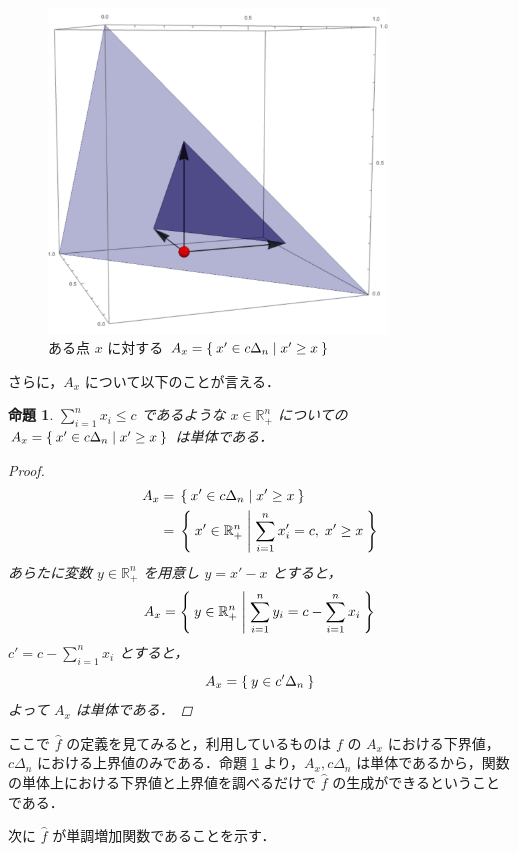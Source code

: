 \documentclass[a4paper,11pt]{jreport}
\newtheorem{proposition}{命題}
\begin{document}
\begin{figure}
\begin{center}
\includegraphics[width=9cm]{graphs/a_on_simplex.pdf}
\caption{ある点 $ x $ に対する $ A_x = \Set{x' \in c \Delta_n | x' \geq x} $}
\label{fig:a_on_simplex}
\end{center}
\end{figure}

さらに，$ A_x $ について以下のことが言える．

\begin{proposition} \label{prop:a_x_is_simplex}
$ \sum_{i = 1}^{n} x_i \leq c $ であるような $ x \in \mathbb{R}_+^n $ についての $ A_x = \Set{x' \in c \Delta_n | x' \geq x} $ は単体である．

\begin{proof}
\begin{align*}
A_x = & \; \Set{x' \in c \Delta_n | x' \geq x} \\
= & \; \Set{x' \in \mathbb{R}_+^n | \sum_{i = 1}^{n} x'_i = c, \; x' \geq x}
\end{align*}
あらたに変数 $ y \in \mathbb{R}_+^n $ を用意し $ y = x' - x $ とすると，
$$ A_x = \Set{y \in \mathbb{R}_+^n | \sum_{i = 1}^{n} y_i = c - \sum_{i = 1}^{n} x_i} $$
$ c' = c - \sum_{i = 1}^{n} x_i $ とすると，
$$ A_x = \Set{y \in c' \Delta_n} $$
よって $ A_x $ は単体である．
\end{proof}

\end{proposition}

ここで $ \hat{f} $ の定義を見てみると，利用しているものは $ f $ の $ A_x $ における下界値，$ c \Delta_n $ における上界値のみである．命題 \ref{prop:a_x_is_simplex} より，$ A_x, c \Delta_n $ は単体であるから，関数の単体上における下界値と上界値を調べるだけで $ \hat{f} $ の生成ができるということである．\par
次に $ \hat{f} $ が単調増加関数であることを示す．
\end{document}
